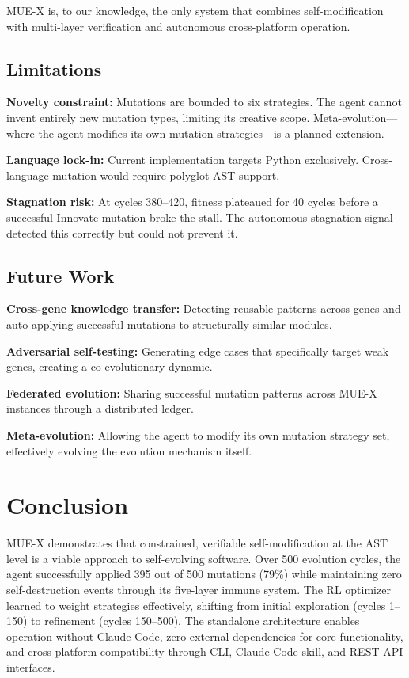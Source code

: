 \documentclass[11pt,a4paper]{article}
\begin{document}
MUE-X is, to our knowledge, the only system that combines self-modification with multi-layer verification and autonomous cross-platform operation.

\subsection{Limitations}

\textbf{Novelty constraint:} Mutations are bounded to six strategies. The agent cannot invent entirely new mutation types, limiting its creative scope. Meta-evolution—where the agent modifies its own mutation strategies—is a planned extension.

\textbf{Language lock-in:} Current implementation targets Python exclusively. Cross-language mutation would require polyglot AST support.

\textbf{Stagnation risk:} At cycles 380--420, fitness plateaued for 40 cycles before a successful Innovate mutation broke the stall. The autonomous stagnation signal detected this correctly but could not prevent it.

\subsection{Future Work}

\textbf{Cross-gene knowledge transfer:} Detecting reusable patterns across genes and auto-applying successful mutations to structurally similar modules.

\textbf{Adversarial self-testing:} Generating edge cases that specifically target weak genes, creating a co-evolutionary dynamic.

\textbf{Federated evolution:} Sharing successful mutation patterns across MUE-X instances through a distributed ledger.

\textbf{Meta-evolution:} Allowing the agent to modify its own mutation strategy set, effectively evolving the evolution mechanism itself.

\section{Conclusion}

MUE-X demonstrates that constrained, verifiable self-modification at the AST level is a viable approach to self-evolving software. Over 500 evolution cycles, the agent successfully applied 395 out of 500 mutations (79\%) while maintaining zero self-destruction events through its five-layer immune system. The RL optimizer learned to weight strategies effectively, shifting from initial exploration (cycles 1--150) to refinement (cycles 150--500). The standalone architecture enables operation without Claude Code, zero external dependencies for core functionality, and cross-platform compatibility through CLI, Claude Code skill, and REST API interfaces.
\end{document}
